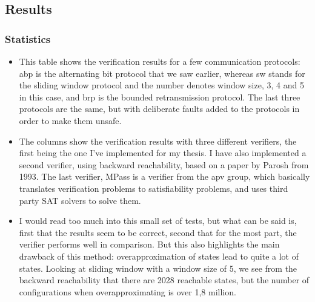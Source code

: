 \documentclass[handout]{beamer}
\begin{document}
\begin{footnotesize}
\section{Results}
\begin{frame}
  \frametitle{Statistics}
\begin{itemize}
  \item
    This table shows the verification results for a few communication protocols: abp is the alternating bit protocol that we saw earlier, whereas sw stands for the sliding window protocol and the number denotes window size, 3, 4 and 5 in this case, and brp is the bounded retransmission protocol. The last three protocols are the same, but with deliberate faults added to the protocols in order to make them unsafe.
    \item
    The columns show the verification results with three different verifiers, the first being the one I've implemented for my thesis. I have also implemented a second verifier, using backward reachability, based on a paper by Parosh from 1993. The last verifier, MPass is a verifier from the apv group, which basically translates verification problems to satisfiability problems, and uses third party SAT solvers to solve them.
    \item
    I would read too much into this small set of tests, but what can be said is, first that the results seem to be correct, second that for the most part, the verifier performs well in comparison. But this also highlights the main drawback of this method: overapproximation of states lead to quite a lot of states. Looking at sliding window with a window size of 5, we see from the backward reachability that there are 2028 reachable states, but the number of configurations when overapproximating is over 1,8 million.
\end{itemize}
\end{frame}

\end{footnotesize}
\end{document}
